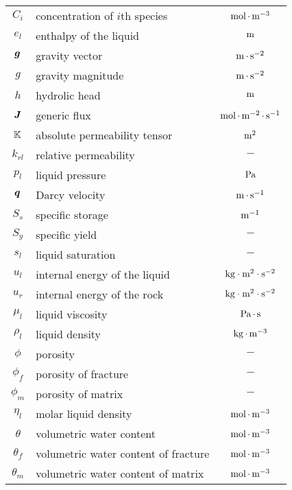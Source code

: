 \begin{center}
\begin{longtable}{cp{7cm}c}
$C_i$      & concentration of $i$th species    &  ${\rm mol}{\,\cdot\,}{\rm m}^{-3}$ \\
$e_l$      & enthalpy of the liquid        &  ${\rm m}$  \\
${\boldsymbol{g}}$      & gravity vector       &  ${\rm m}{\,\cdot\,}{\rm s}^{-2}$  \\
$g$        & gravity magnitude    &  ${\rm m}{\,\cdot\,}{\rm s}^{-2}$  \\
$h$        & hydrolic head        &  ${\rm m}$  \\
${\boldsymbol{J}}$      & generic flux         &  ${\rm mol}{\,\cdot\,}{\rm m}^{-2}{\,\cdot\,}{\rm s}^{-1}$  \\
${\mathbb K}$       & absolute permeability tensor & ${\rm m}^2$ \\
$k_{rl}$   & relative permeability&  $-$ \\
$p_l$      & liquid pressure      &  ${\rm Pa}$ \\
${\boldsymbol{q}}$      & Darcy velocity       &  ${\rm m}{\,\cdot\,}{\rm s}^{-1}$  \\
$S_s$      & specific storage     &  ${\rm m}^{-1}$  \\
$S_y$      & specific yield       &  $-$  \\
$s_l$      & liquid saturation    &  $-$ \\
$u_l$      & internal energy of the liquid   &  ${\rm kg}\cdot{\rm m}^2\cdot {\rm s}^{-2}$ \\
$u_r$      & internal energy of the rock     &  ${\rm kg}\cdot{\rm m}^2\cdot {\rm s}^{-2}$  \\
\hline
$\mu_l$    & liquid viscosity     &  ${\rm Pa}{\,\cdot\,}{\rm s}$ \\
$\rho_l$   & liquid density       &  ${\rm kg}{\,\cdot\,}{\rm m}^{-3}$ \\
$\phi$     & porosity             &  $-$  \\
$\phi_f$   & porosity of fracture &  $-$  \\
$\phi_m$   & porosity of matrix   &  $-$  \\
$\eta_l$   & molar liquid density &  ${\rm mol}{\,\cdot\,}{\rm m}^{-3}$ \\
$\theta$   & volumetric water content  &  ${\rm mol}{\,\cdot\,}{\rm m}^{-3}$ \\
$\theta_f$ & volumetric water content of fracture &  ${\rm mol}{\,\cdot\,}{\rm m}^{-3}$ \\
$\theta_m$ & volumetric water content of matrix   &  ${\rm mol}{\,\cdot\,}{\rm m}^{-3}$ \\

\end{longtable}
\end{center}








